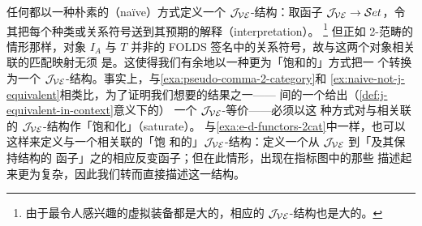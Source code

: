 任何\trVirtualEquipment{}都以一种朴素的（naïve）方式定义一个 $\mathcal{J}_{\mathcal{VE}}$-结构：取函子
$\mathcal{J}_{\mathcal{VE}}\to\mathcal{S}et$，令其把每个种类或关系符号送到其预期的解释（interpretation）。
\footnote{由于最令人感兴趣的虚拟装备都是大的，相应的 $\mathcal{J}_{\mathcal{VE}}$-结构也是大的。}
但正如 2-范畴的情形那样，对象 $I_{A}$ 与 $T$ 并非\trVirtualEquipment{}的
FOLDS 签名中的关系符号，故与这两个对象相关联的匹配映射无须
是\trMonomorphism。这使得我们有余地以一种更为「饱和的」方式把一
个\trVirtualEquipment{}转换为一个 $\mathcal{J}_{\mathcal{VE}}$-结构。事实上，与\cref{exa:pseudo-comma-2-category}和%
\cref{ex:naive-not-j-equivalent}相类比，为了证明我们想要的结果之一——%
\trVirtualEquipment{}间的一个\trBiequivalence{}给出（\cref{def:j-equivalent-in-context}意义下的）
一个 $\mathcal{J}_{\mathcal{VE}}$-等价——必须以这
种方式对与\trVirtualEquipment{}相关联的 $\mathcal{J}_{\mathcal{VE}}$-结构作「饱和化」（saturate）。
与\cref{exa:e-d-functors-2cat}中一样，也可以这样来定义与一个\trVirtualEquipment{}相关联的「饱
和的」$\mathcal{J}_{\mathcal{VE}}$-结构：定义一个从 $\mathcal{J}_{\mathcal{VE}}$ 到「\trVirtualEquipment{}及其保持结构的
函子」之\trCategory{}的相应反变函子；但在此情形，出现在指标图中的那些%
\trVirtualEquipment{}描述起来更为复杂，因此我们转而直接描述这一结构。

